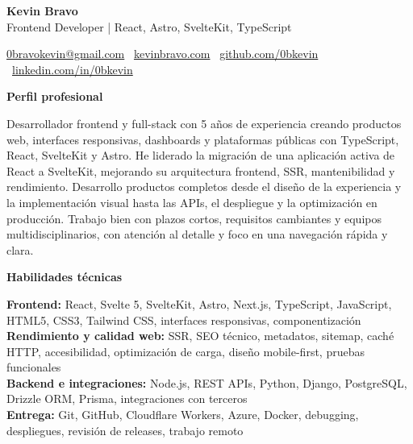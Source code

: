 \documentclass[11pt]{article}
\begin{document}
\begin{center}
    {\LARGE \textbf{Kevin Bravo}}\\
    Frontend Developer | React, Astro, SvelteKit, TypeScript \\
    \hrulefill
\end{center}

\begin{center}
    \href{mailto:0bravokevin@gmail.com}{0bravokevin@gmail.com}
    \textbullet\
    \href{https://kevinbravo.com}{kevinbravo.com}
    \textbullet\
    \href{https://github.com/0bkevin}{github.com/0bkevin}
    \textbullet\
    \href{https://www.linkedin.com/in/0bkevin/}{linkedin.com/in/0bkevin}
\end{center}

\vspace{4pt}
\begin{center}
    \textbf{Perfil profesional}
\end{center}
\vspace{-4pt}
Desarrollador frontend y full-stack con 5 años de experiencia creando productos web, interfaces responsivas, dashboards y plataformas públicas con TypeScript, React, SvelteKit y Astro. He liderado la migración de una aplicación activa de React a SvelteKit, mejorando su arquitectura frontend, SSR, mantenibilidad y rendimiento. Desarrollo productos completos desde el diseño de la experiencia y la implementación visual hasta las APIs, el despliegue y la optimización en producción. Trabajo bien con plazos cortos, requisitos cambiantes y equipos multidisciplinarios, con atención al detalle y foco en una navegación rápida y clara.

\vspace{8pt}
\begin{center}
    \textbf{Habilidades técnicas}
\end{center}
\vspace{-4pt}
\textbf{Frontend:} React, Svelte 5, SvelteKit, Astro, Next.js, TypeScript, JavaScript, HTML5, CSS3, Tailwind CSS, interfaces responsivas, componentización \\
\textbf{Rendimiento y calidad web:} SSR, SEO técnico, metadatos, sitemap, caché HTTP, accesibilidad, optimización de carga, diseño mobile-first, pruebas funcionales \\
\textbf{Backend e integraciones:} Node.js, REST APIs, Python, Django, PostgreSQL, Drizzle ORM, Prisma, integraciones con terceros \\
\textbf{Entrega:} Git, GitHub, Cloudflare Workers, Azure, Docker, debugging, despliegues, revisión de releases, trabajo remoto
\end{document}
